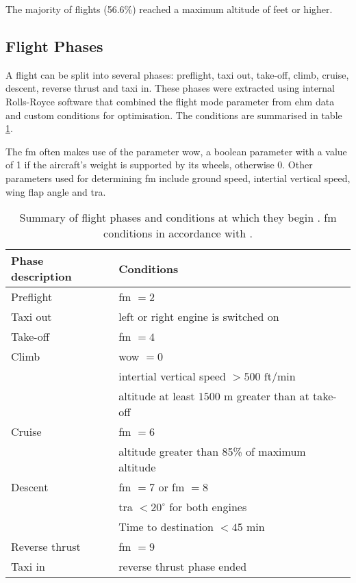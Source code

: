The majority of flights (56.6\%) reached a maximum altitude of  feet or higher.

\subsection{Flight Phases} \label{sec:phases}
A flight can be split into several phases: preflight, taxi out, take-off, climb, cruise, descent, reverse thrust and taxi in. These phases were extracted using internal Rolls-Royce software \cite[]{konig_br725stats_2015} that combined the flight mode parameter from \ac{ehm} data \cite[]{reischl_br700-725a1-12_2014} and custom conditions for optimisation. The conditions are summarised in table \ref{tab:flight_phases}.

The \ac{fm} often makes use of the parameter \ac{wow}, a boolean parameter with a value of 1 if the aircraft's weight is supported by its wheels, otherwise 0. Other parameters used for determining \ac{fm} include ground speed, intertial vertical speed, wing flap angle and \ac{tra}.

\begin{table}
    \begin{center}
        \caption{\label{tab:flight_phases} Summary of flight phases and conditions at which they begin \cite[]{konig_br725stats_2015}. \ac{fm} conditions in accordance with \citet{reischl_br700-725a1-12_2014}.}
        \begin{tabular}{ l l }
            Phase description & Conditions \\
            \midrule
            Preflight & \ac{fm} \(= 2\) \\
            Taxi out & left or right engine is switched on \\
            Take-off & \ac{fm} \(= 4\) \\
            Climb & \ac{wow} \(= 0\) \\
            & intertial vertical speed \(> 500\) \(\text{ft} / \text{min}\) \\
            & altitude at least \(1500 \) m greater than at take-off \\
            Cruise & \ac{fm} \(= 6\) \\
            & altitude greater than 85\% of maximum altitude \\
            Descent & \ac{fm} \(= 7\) or \ac{fm} \(= 8\) \\
            & \ac{tra} \(< 20^{\circ} \) for both engines \\
            & Time to destination \(< 45\) \(\text{min}\) \\
            Reverse thrust & \ac{fm} \(= 9\) \\
            Taxi in & reverse thrust phase ended
        \end{tabular}
    \end{center}
\end{table}

